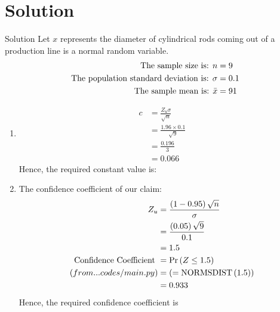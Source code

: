 \documentclass{beamer}
\providecommand{\pr}[1]{\ensuremath{\Pr\left(#1\right)}}
\providecommand{\brak}[1]{\ensuremath{\left(#1\right)}}
\begin{document}
\section{Solution}
\begin{frame}[allowframebreaks]{Solution}
 Let $x$ represents the diameter of cylindrical rods coming out of a production line is a normal random variable.\\

\begin{align}
 \text{The sample size is: } n &= 9 \\
\text{The population standard deviation is: } \sigma &= 0.1 \\
\text{The sample mean is: }\Bar{x} &= 91
\end{align}

\begin{enumerate}[label=(\alph*)]
    \item \begin{align} c &= \frac{Z_u  \sigma}{\sqrt{n}}\\
    &= \frac{1.96 \times 0.1}{\sqrt{9}}\\
    &= \frac{0.196}{3}\\
    &= 0.066
    \end{align}
     Hence, the required constant value is: 
\newpage
     \item The confidence coefficient of our claim:
     \begin{align}
         Z_u &= \frac{\brak{1 - 0.95} \sqrt{n}}{\sigma}\\
         &= \frac{\brak{0.05} \sqrt{9}}{0.1}\\
         &= 1.5 \\
         \text{Confidence Coefficient } &= \pr{Z \leq 1.5}\\
          \text{\brak{from ...codes/main.py}} &= \brak{ = \text{NORMSDIST} \brak{1.5}} \\
         &= 0.933
     \end{align}
    Hence, the required confidence coefficient is 
\end{enumerate}
\end{frame} 
\end{document}
